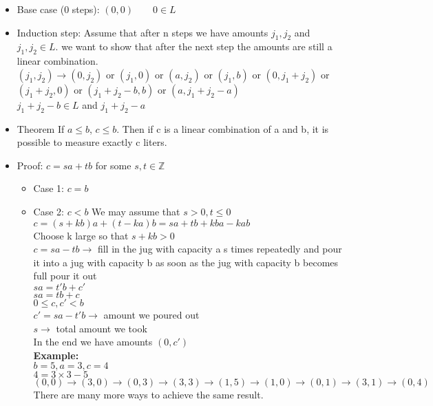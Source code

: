 \documentclass[9pt, letterpaper, oneside]{article}
\begin{document}
\begin{itemize}
	\item Base case (0 steps): $(0,0) \qquad 0 \in L$
	\item Induction step: Assume that after n steps we have amounts $j_1, j_2$ and $j_1, j_2 \in L$. we want to show that after the next step the amounts are still a linear combination.\\
	$(j_1, j_2) \to (0, j_2)$ or $(j_1, 0)$ or $(a, j_2)$ or $(j_1, b)$ or $(0, j_1 + j_2)$ or $(j_1 + j_2, 0)$ or $(j_1 + j_2 - b, b)$ or $(a, j_1 + j_2 -a)$\\
	$j_1 + j_2 - b \in L$ and $j_1 + j_2 - a$
	\item Theorem If $a \leq b$, $c \leq b$. Then if c is a linear combination of a and b, it is possible to measure exactly c liters.
	\item Proof: $c = sa + tb$ for some $s, t \in \mathbb{Z}$
	\begin{itemize}
		\item Case 1: $c = b$
		\item Case 2: $c < b$ We may assume that $s > 0, t \leq 0$\\
			  $c = (s + kb)a + (t - ka)b = sa + tb + kba - kab$\\
              Choose k large so that $s + kb > 0$\\
              $c = sa -tb \to$ fill in the jug with capacity a s times repeatedly and pour it into a jug with capacity b as soon as the jug with capacity b becomes full pour it out\\
              $sa = t'b + c'$\\
              $sa = tb + c$\\
              $0 \leq c, c' <b$\\
              $c' = sa - t'b \to$ amount we poured out \\
              $s \to$ total amount we took\\
              In the end we have amounts $(0, c')$\\
              \textbf{Example:}\\
              $b = 5, a = 3, c = 4$\\
              $4 = 3 \times 3 - 5$\\
	          $(0,0) \to (3,0) \to (0,3) \to (3,3) \to (1,5) \to (1,0) \to (0,1) \to (3,1) \to (0,4)$\\
              There are many more ways to achieve the same result.
        \end{itemize}
\end{itemize}
\end{document}
